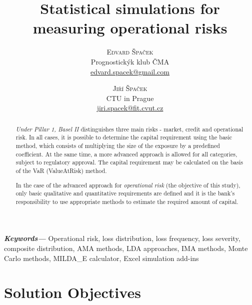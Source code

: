 \documentclass{article}
\title{\vspace{-15mm}\fontsize{24pt}{10pt}\selectfont\textbf{Statistical simulations for measuring operational risks}} %
\author{
\large
\textsc{Edvard Špaček} \\
\normalsize Prognostickýk klub ČMA \\ %
\normalsize \href{mailto:edvard.spacek@gmail.com}{edvard.spacek@gmail.com} %
\and
\large
\textsc{Jiří Špaček} \\
\normalsize CTU in Prague \\ %
\normalsize \href{mailto:jiri.spacek@fit.cvut.cz}{jiri.spacek@fit.cvut.cz} %
\and
\vspace{-5mm}
}
\date{}
\providecommand{\keywords}[1]
{
  \small	
  \textbf{\textit{Keywords---}} #1
}
\begin{document}
\maketitle %

\thispagestyle{fancy} %








\begin{abstract}

\noindent \emph{Under Pillar 1, Basel II} distinguishes three main risks - market, credit and operational risk. In all cases, it is possible to determine the capital requirement using the basic method, which consists of multiplying the size of the exposure by a predefined coefficient. At the same time, a more advanced approach is allowed for all categories, subject to regulatory approval. The capital requirement may be calculated on the basis of the VaR (ValueAtRisk) method.

In the case of the advanced approach for \emph{operational risk} (the objective of this study), only basic qualitative and quantitative requirements are defined and it is the bank's responsibility to use appropriate methods to estimate the required amount of capital.

\end{abstract}



\keywords{Operational risk, loss distribution, loss frequency, loss severity, composite distribution, AMA methods, LDA approaches, IMA methods, Monte Carlo methods, MILDA\_E calculator, Excel simulation add-ins}


\newpage


\section{Solution Objectives}
\end{document}
